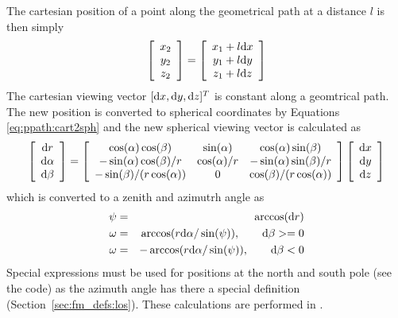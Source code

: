 The cartesian position of a point along the geometrical path at a
distance $l$ is then simply
\begin{equation}
 \left[ \begin{array}{c}
  x_2 \\
  y_2 \\
  z_2
 \end{array} \right] =
 \left[ \begin{array}{c}
  x_1 + l\mathrm{d} x \\
  y_1 + l\mathrm{d} y \\
  z_1 + l\mathrm{d} z
 \end{array} \right]
  \label{eq:ppath:xdl}
\end{equation}
The cartesian viewing vector $[\mathrm{d} x, \mathrm{d} y, \mathrm{d} z]^T$ is
constant along a geomtrical path. The new position is
converted to spherical coordinates by Equations
\ref{eq:ppath:cart2sph} and the new spherical viewing vector is
calculated as
\begin{equation}
 \left[ \begin{array}{c}
  \mathrm{d} r \\
  \mathrm{d} \alpha \\
  \mathrm{d} \beta
 \end{array} \right] =
 \left[ \begin{array}{ccc}
  \cos(\alpha)\cos(\beta) & \sin(\alpha)            & \cos(\alpha)\sin(\beta) \\ 
  -\sin(\alpha)\cos(\beta)/r & \cos(\alpha)/r & -\sin(\alpha)\sin(\beta)/r \\ 
  -\sin(\beta)/(r\cos(\alpha)) & 0             & \cos(\beta)/(r\cos(\alpha)) 
 \end{array} \right] 
 \left[ \begin{array}{c}
  \mathrm{d} x \\
  \mathrm{d} y \\
  \mathrm{d} z
 \end{array} \right]
 \label{eq:ppath:los2sph}
\end{equation}
which is converted to a zenith and azimutrh angle as
\begin{eqnarray}
  \psi &=& \arccos(\mathrm{d} r) \nonumber  \\
  \omega &=& \arccos(r\mathrm{d}\alpha/\sin(\psi)), \qquad \mathrm{d}\beta >= 0 \\
  \omega &=& -\arccos(r\mathrm{d}\alpha/\sin(\psi)), \qquad \mathrm{d}\beta < 0 
                                     \nonumber
 \label{eq:ppath:sph2cart}
\end{eqnarray}
Special expressions must be used for positions at the north and south
pole (see the code) as the azimuth angle has there a special
definition (Section~\ref{sec:fm_defs:los}). These calculations are performed in
.

